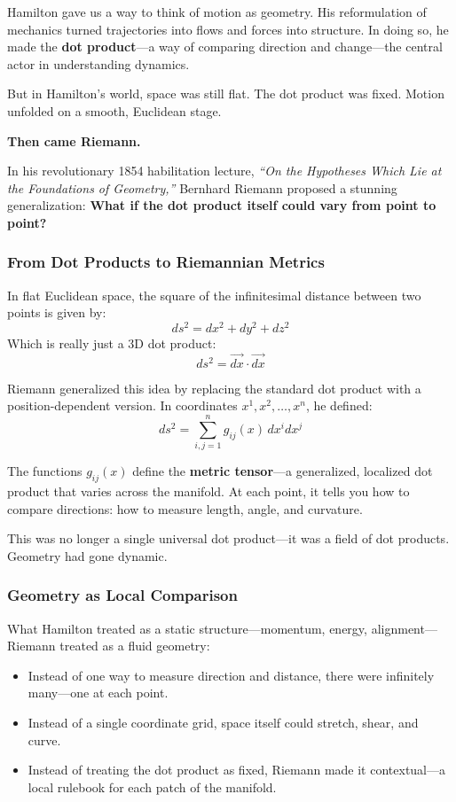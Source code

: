 Hamilton gave us a way to think of motion as geometry. His reformulation of mechanics turned trajectories into flows and forces into structure. In doing so, he made the \textbf{dot product}—a way of comparing direction and change—the central actor in understanding dynamics.

But in Hamilton’s world, space was still flat. The dot product was fixed. Motion unfolded on a smooth, Euclidean stage.

\medskip

\textbf{Then came Riemann.}

In his revolutionary 1854 habilitation lecture, \textit{“On the Hypotheses Which Lie at the Foundations of Geometry,”} Bernhard Riemann proposed a stunning generalization:  
\textbf{What if the dot product itself could vary from point to point?}

\subsubsection*{From Dot Products to Riemannian Metrics}

In flat Euclidean space, the square of the infinitesimal distance between two points is given by:
\[
ds^2 = dx^2 + dy^2 + dz^2
\]
Which is really just a 3D dot product:
\[
ds^2 = \vec{dx} \cdot \vec{dx}
\]

Riemann generalized this idea by replacing the standard dot product with a position-dependent version. In coordinates \( x^1, x^2, \dots, x^n \), he defined:
\[
ds^2 = \sum_{i,j=1}^n g_{ij}(x) \, dx^i dx^j
\]

The functions \( g_{ij}(x) \) define the \textbf{metric tensor}—a generalized, localized dot product that varies across the manifold. At each point, it tells you how to compare directions: how to measure length, angle, and curvature.

This was no longer a single universal dot product—it was a field of dot products. Geometry had gone dynamic.

\subsubsection*{Geometry as Local Comparison}

What Hamilton treated as a static structure—momentum, energy, alignment—Riemann treated as a fluid geometry:

\begin{itemize}
  \item Instead of one way to measure direction and distance, there were infinitely many—one at each point.
  \item Instead of a single coordinate grid, space itself could stretch, shear, and curve.
  \item Instead of treating the dot product as fixed, Riemann made it contextual—a local rulebook for each patch of the manifold.
\end{itemize}

